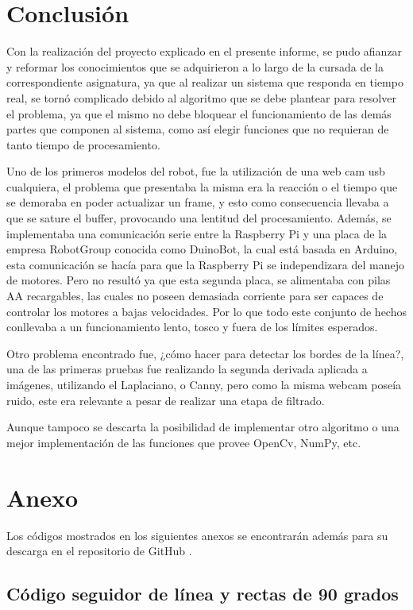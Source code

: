 \documentclass[11pt,a4paper]{article}
\begin{document}
	\section{Conclusión}
	Con la realización del proyecto explicado en el presente informe, se pudo afianzar y reformar los conocimientos que se adquirieron a lo largo de la cursada de la correspondiente asignatura, ya que al realizar un sistema que responda en tiempo real, se tornó complicado debido al algoritmo que se debe plantear para resolver el problema, ya que el mismo no debe bloquear el funcionamiento de las demás partes que componen al sistema, como así elegir funciones que no requieran de tanto tiempo de procesamiento. 
	
	Uno de los primeros modelos del robot, fue la utilización de una web cam usb cualquiera, el problema que presentaba la misma era la reacción o el tiempo que se demoraba en poder actualizar un frame, y esto como consecuencia llevaba a que se sature el buffer, provocando una lentitud del procesamiento. Además, se implementaba una comunicación serie entre la Raspberry Pi y una placa de la empresa RobotGroup conocida como DuinoBot, la cual está basada en Arduino, esta comunicación se hacía para que la Raspberry Pi se independizara del manejo de motores. Pero no resultó ya que esta segunda placa, se alimentaba con pilas AA recargables, las cuales no poseen demasiada corriente para ser capaces de controlar los motores a bajas velocidades. Por lo que todo este conjunto de hechos conllevaba a un funcionamiento lento, tosco y fuera de los límites esperados.
	
	Otro problema encontrado fue, ¿cómo hacer para detectar los bordes de la línea?, una de las primeras pruebas fue realizando la segunda derivada aplicada a imágenes, utilizando el Laplaciano, o Canny, pero como la misma webcam poseía ruido, este era relevante a pesar de realizar una etapa de filtrado.
	
	Aunque tampoco se descarta la posibilidad de implementar otro algoritmo o una mejor implementación de las funciones que provee OpenCv, NumPy, etc.
	
	\newpage
	\appendix
	\section{Anexo}
	Los códigos mostrados en los siguientes anexos se encontrarán además para su descarga en el repositorio de GitHub \cite{Github}.
	
	\subsection{Código seguidor de línea y rectas de 90 grados}
	
\end{document}
